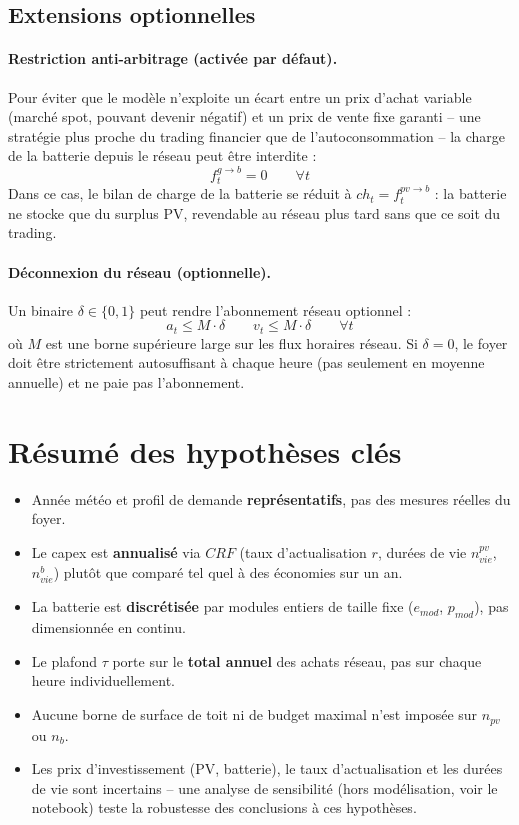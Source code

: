 \documentclass[11pt]{article}
\begin{document}
\subsection{Extensions optionnelles}
\label{sec:extensions}

\paragraph{Restriction anti-arbitrage (activée par défaut).} Pour éviter que le modèle
n'exploite un écart entre un prix d'achat variable (marché spot, pouvant devenir négatif)
et un prix de vente fixe garanti -- une stratégie plus proche du trading financier que de
l'autoconsommation -- la charge de la batterie depuis le réseau peut être interdite :
\begin{equation}
f^{g\to b}_t = 0 \qquad \forall t
\end{equation}
Dans ce cas, le bilan de charge de la batterie se réduit à $ch_t = f^{pv\to b}_t$ : la
batterie ne stocke que du surplus PV, revendable au réseau plus tard sans que ce soit du
trading.

\paragraph{Déconnexion du réseau (optionnelle).} Un binaire $\delta \in \{0,1\}$ peut
rendre l'abonnement réseau optionnel :
\begin{equation}
a_t \leq M \cdot \delta \qquad v_t \leq M \cdot \delta \qquad \forall t
\end{equation}
où $M$ est une borne supérieure large sur les flux horaires réseau. Si $\delta = 0$, le
foyer doit être strictement autosuffisant à chaque heure (pas seulement en moyenne
annuelle) et ne paie pas l'abonnement.

\section{Résumé des hypothèses clés}

\begin{itemize}
\item Année météo et profil de demande \textbf{représentatifs}, pas des mesures réelles
du foyer.
\item Le capex est \textbf{annualisé} via $CRF$ (taux d'actualisation $r$, durées de vie
$n^{pv}_{vie}$, $n^{b}_{vie}$) plutôt que comparé tel quel à des économies sur un an.
\item La batterie est \textbf{discrétisée} par modules entiers de taille fixe
($e_{mod}$, $p_{mod}$), pas dimensionnée en continu.
\item Le plafond $\tau$ porte sur le \textbf{total annuel} des achats réseau, pas sur
chaque heure individuellement.
\item Aucune borne de surface de toit ni de budget maximal n'est imposée sur $n_{pv}$ ou
$n_{b}$.
\item Les prix d'investissement (PV, batterie), le taux d'actualisation et les durées de
vie sont incertains -- une analyse de sensibilité (hors modélisation, voir le notebook)
teste la robustesse des conclusions à ces hypothèses.
\end{itemize}
\end{document}
